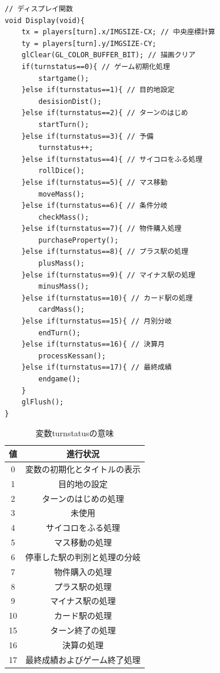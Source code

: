 \documentclass[a4j]{jarticle}
\begin{document}
\begin{lstlisting}[basicstyle=\ttfamily\footnotesize, frame=single,label=Display,caption=Display関数]
// ディスプレイ関数
void Display(void){
    tx = players[turn].x/IMGSIZE-CX; // 中央座標計算
    ty = players[turn].y/IMGSIZE-CY;
    glClear(GL_COLOR_BUFFER_BIT); // 描画クリア
    if(turnstatus==0){ // ゲーム初期化処理
        startgame();
    }else if(turnstatus==1){ // 目的地設定
        desisionDist();
    }else if(turnstatus==2){ // ターンのはじめ
        startTurn();
    }else if(turnstatus==3){ // 予備
        turnstatus++;
    }else if(turnstatus==4){ // サイコロをふる処理
        rollDice();
    }else if(turnstatus==5){ // マス移動
        moveMass();
    }else if(turnstatus==6){ // 条件分岐
        checkMass();
    }else if(turnstatus==7){ // 物件購入処理
        purchaseProperty();
    }else if(turnstatus==8){ // プラス駅の処理
        plusMass();
    }else if(turnstatus==9){ // マイナス駅の処理
        minusMass();
    }else if(turnstatus==10){ // カード駅の処理
        cardMass();
    }else if(turnstatus==15){ // 月別分岐
        endTurn();
    }else if(turnstatus==16){ // 決算月
        processKessan();
    }else if(turnstatus==17){ // 最終成績
        endgame();
    }
    glFlush();
}
    \end{lstlisting} 

    \begin{table}[H]
  \caption{変数turnstatusの意味}
\label{turnstatus}
\begin{center}
    \begin{tabular}{c|c}\hline
    値 & 進行状況 \\ \hline \hline
    0 & 変数の初期化とタイトルの表示 \\ 
    1 & 目的地の設定 \\
    2 & ターンのはじめの処理 \\
    3 & 未使用 \\
    4 & サイコロをふる処理 \\
    5 & マス移動の処理 \\
    6 & 停車した駅の判別と処理の分岐 \\
    7 & 物件購入の処理 \\
    8 & プラス駅の処理 \\
    9 & マイナス駅の処理 \\
    10 & カード駅の処理 \\
    15 & ターン終了の処理 \\
    16 & 決算の処理 \\
    17 & 最終成績およびゲーム終了処理 \\ \hline
    \end{tabular}
\end{center}
\end{table}
\end{document}
